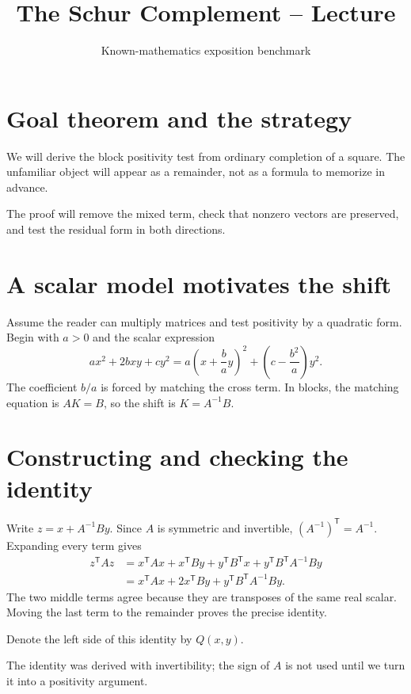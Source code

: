 \documentclass[12pt,reqno]{amsart}
\title{The Schur Complement -- Lecture}
\author{Known-mathematics exposition benchmark}
\date{}
\begin{document}
\maketitle
\section{Goal theorem and the strategy}
We will derive the block positivity test from ordinary completion of a
square. The unfamiliar object will appear as a remainder, not as a formula
to memorize in advance.
\begin{theorem}\label{thm:main}

\end{theorem}
The proof will remove the mixed term, check that nonzero vectors are
preserved, and test the residual form in both directions.

\section{A scalar model motivates the shift}
Assume the reader can multiply matrices and test positivity by a quadratic
form. Begin with $a>0$ and the scalar expression
\[
 ax^2+2bxy+cy^2
 =a\left(x+\frac ba y\right)^2+\left(c-\frac{b^2}{a}\right)y^2.
\]
The coefficient $b/a$ is forced by matching the cross term. In blocks,
the matching equation is $AK=B$, so the shift is $K=A^{-1}B$.

\section{Constructing and checking the identity}
Write $z=x+A^{-1}By$. Since $A$ is symmetric and invertible,
$(A^{-1})^{\mathsf T}=A^{-1}$. Expanding every term gives
\begin{align*}
 z^{\mathsf T}Az
 &=x^{\mathsf T}Ax+x^{\mathsf T}By+y^{\mathsf T}B^{\mathsf T}x
       +y^{\mathsf T}B^{\mathsf T}A^{-1}By\\
 &=x^{\mathsf T}Ax+2x^{\mathsf T}By
       +y^{\mathsf T}B^{\mathsf T}A^{-1}By.
\end{align*}
The two middle terms agree because they are transposes of the same real
scalar. Moving the last term to the remainder proves the precise identity.
\begin{lemma}\label{lem:square}

\end{lemma}
Denote the left side of this identity by $Q(x,y)$.

The identity was derived with invertibility; the sign of $A$ is not used
until we turn it into a positivity argument.
\end{document}
